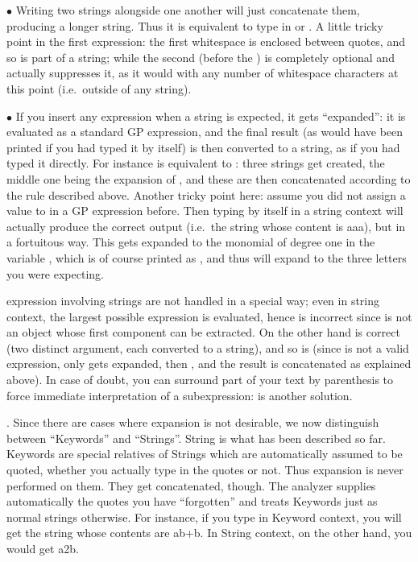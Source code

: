 $\bullet$ Writing two strings alongside one another will just concatenate
them, producing a longer string. Thus it is equivalent to type in
 or . A little tricky point in the first expression:
the first whitespace is enclosed between quotes, and so is part of a string;
while the second (before the ) is completely optional and 
actually suppresses it, as it would with any number of whitespace characters
at this point (i.e.~outside of any string).

$\bullet$ If you insert any expression when a string is expected, it gets
``expanded'': it is evaluated as a standard GP expression, and the final
result (as would have been printed if you had typed it by itself) is then
converted to a string, as if you had typed it directly. For instance  is equivalent to : three strings get created, the middle
one being the expansion of , and these are then concatenated
according to the rule described above. Another tricky point here: assume you
did not assign a value to  in a GP expression before. Then typing
 by itself in a string context will actually produce the correct
output (i.e.~the string whose content is aaa), but in a fortuitous way. This
 gets expanded to the monomial of degree one in the variable
, which is of course printed as , and thus will expand to
the three letters you were expecting.

 expression involving strings are not handled in a
special way; even in string context, the largest possible expression is
evaluated, hence  is incorrect since  is not an
object whose first component can be extracted. On the other hand
 is correct (two distinct argument, each converted to a
string), and so is  (since  is not a valid
expression, only  gets expanded, then , and the result is
concatenated as explained above). In case of doubt, you can surround part of
your text by parenthesis to force immediate interpretation of a
subexpression:  is another solution.

. Since there are cases where expansion is not desirable, we
now distinguish between ``Keywords'' and ``Strings''. String is what has been
described so far. Keywords are special relatives of Strings which are
automatically assumed to be quoted, whether you actually type in the quotes
or not. Thus expansion is never performed on them. They get concatenated,
though. The analyzer supplies automatically the quotes you have ``forgotten''
and treats Keywords just as normal strings otherwise. For instance, if you
type  in Keyword context, you will get the string whose contents
are ab+b. In String context, on the other hand, you would get a2\kbd{*}b.

